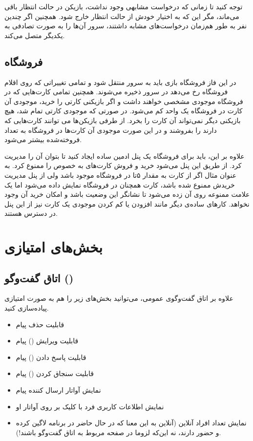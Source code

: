 \documentclass[]{article}
\begin{document}
توجه کنید تا زمانی که درخواست مشابهی وجود نداشت، بازیکن در حالت انتظار باقی می‌ماند، مگر این که به اختیار خودش از حالت انتظار خارج شود. همچنین اگر چندین نفر به طور هم‌زمان درخواست‌های مشابه داشتند، سرور آن‌ها را به صورت تصادفی به یکدیگر متصل می‌کند.

\subsection*{{\titr فروشگاه}}
در این فاز فروشگاه بازی باید به سرور منتقل شود و تمامی تغییراتی که روی اقلام فروشگاه رخ می‌دهد در سرور ذخیره می‌شوند. همچنین تمامی کارت‌هایی که در فروشگاه موجودی مشخصی خواهند داشت و اگر بازیکنی کارتی را خرید، موجودی آن کارت در فروشگاه یک واحد کم می‌شود. در صورتی که موجودی کارتی تمام شد، هیچ بازیکنی دیگر نمی‌تواند آن کارت را بخرد. از طرفی بازیکن‌ها می توانند کارت‌هایی که دارند را بفروشند و در این صورت موجودی آن کارت‌ها در فروشگاه به تعداد فروخته‌شده بیشتر می‌شود.

علاوه بر این، باید برای فروشگاه یک پنل ادمین ساده ایجاد کنید تا بتوان آن را مدیریت کرد. از طریق این پنل می‌شود خرید و فروش کارت‌های به خصوص را ممنوع کرد. به عنوان مثال اگر از کارت  به مقدار ۵تا در فروشگاه موجود باشد ولی از پنل مدیریت خریدش ممنوع شده باشد، کارت همچنان در فروشگاه نمایش داده می‌شود اما یک علامت ممنوعه روی آن زده می‌شود تا نشانگر این وضعیت باشد و امکان خرید آن وجود نخواهد. کارهای ساده‌ی دیگر مانند افزودن یا کم کردن موجودی یک کارت نیز از این پنل در دسترس هستند.


\section*{{\titr بخش‌های امتیازی}}

\subsection*{{\titr اتاق گفت‌وگو ()}}

علاوه بر اتاق گفت‌و‌گوی عمومی، می‌توانید بخش‌های زیر را هم به صورت امتیازی پیاده‌سازی کنید.

\begin{itemize}
	\item قابلیت حذف پیام
	\item  قابلیت ویرایش () پیام
	\item قابلیت پاسخ دادن () پیام
	\item قابلیت سنجاق کردن () پیام
	\item نمایش آواتار ارسال کننده پیام
	\item نمایش اطلاعات کاربری فرد با کلیک بر روی آواتار او
	\item نمایش تعداد افراد آنلاین (آنلاین به این معنا که در حال حاضر در برنامه لاگین کرده و حضور دارند، نه این‌که لزوما در صفحه مربوط به اتاق گفت‌وگو باشند!).
\end{itemize}
\end{document}
